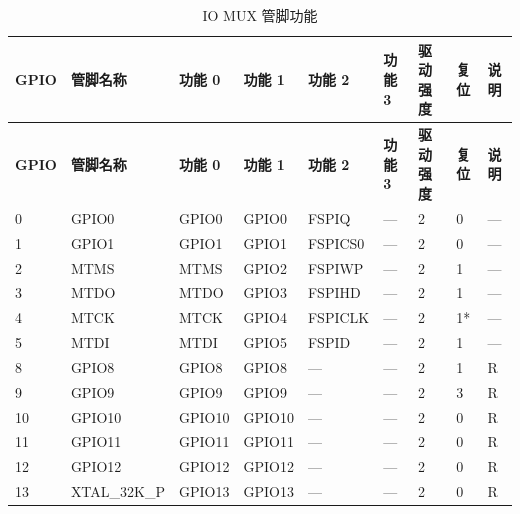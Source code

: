
   \begin{longtable}[c]{|p{0.7cm}|p{1.9cm}|p{1.9cm}|p{1.6cm}|p{1.6cm}|p{1.6cm}|p{1cm}|p{1cm}|p{1.2cm}| }
   \caption{IO MUX 管脚功能}
    \label{table:iomux_pads} \\
        \hline
        \rowcolor{lightgray}
\textbf{GPIO} & \textbf{管脚名称} & \textbf{功能 0} & \textbf{功能 1} & \textbf{功能 2} & \textbf{功能 3} & \textbf{驱动强度} & \textbf{复位} & \textbf{说明} \\
 \hline
\endfirsthead
        \hline
        \rowcolor{lightgray}
        \textbf{GPIO} & \textbf{管脚名称} & \textbf{功能 0} & \textbf{功能 1} & \textbf{功能 2} & \textbf{功能 3} & \textbf{驱动强度} & \textbf{复位} & \textbf{说明} \\
        \hline
        \endhead
        \endfoot

0 & GPIO0            & GPIO0         & GPIO0   & FSPIQ        & ---            & 2           & 0 & --- \\ \hline
1 & GPIO1            & GPIO1         & GPIO1   & FSPICS0      & ---            & 2           & 0 & --- \\ \hline
2 & MTMS             & MTMS          & GPIO2   & FSPIWP       & ---            & 2           & 1 & --- \\ \hline
3 & MTDO             & MTDO          & GPIO3   & FSPIHD       & ---            & 2           & 1 & --- \\ \hline
4 & MTCK             & MTCK          & GPIO4   & FSPICLK      & ---            & 2           & 1* & --- \\ \hline
5 & MTDI             & MTDI          & GPIO5   & FSPID        & ---            & 2           & 1 & --- \\ \hline
8 & GPIO8            & GPIO8         & GPIO8   & ---          & ---            & 2           & 1 & R \\ \hline
9 & GPIO9            & GPIO9         & GPIO9   & ---          & ---            & 2           & 3 & R \\ \hline
10 & GPIO10          & GPIO10        & GPIO10  & ---          & ---            & 2           & 0 & R \\ \hline
11 & GPIO11          & GPIO11        & GPIO11  & ---          & ---            & 2           & 0 & R \\ \hline
12 & GPIO12          & GPIO12        & GPIO12  & ---          & ---            & 2           & 0 & R \\ \hline
13 & XTAL\_32K\_P    & GPIO13        & GPIO13  & ---          & ---            & 2           & 0 & R \\ \hline

\end{longtable}
